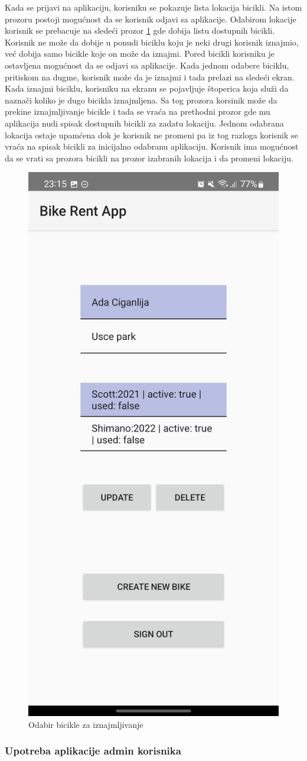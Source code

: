 \documentclass[12pt,oneside]{memoir}
\begin{document}
Kada se prijavi na aplikaciju, korisniku se pokazuje lista lokacija bicikli. Na istom prozoru postoji mogućnost da se korisnik odjavi sa aplikacije. Odabirom lokacije korisnik se prebacuje na sledeći prozor \ref{fig:odabirBicikle} gde dobija listu dostupnih bicikli. Korisnik ne može da dobije u ponudi biciklu koju je neki drugi korisnik iznajmio, već dobija samo bicikle koje on može da iznajmi. Pored bicikli korisniku je ostavljena mogućnost da se odjavi sa aplikacije. Kada jednom odabere biciklu, pritiskom na dugme, korisnik može da je iznajmi i tada prelazi na sledeći ekran. Kada iznajmi biciklu, korisniku na ekranu se pojavljuje štoperica koja služi da naznači koliko je dugo bicikla iznajmljena. Sa tog prozora korsinik može da prekine iznajmljivanje bicikle i tada se vraća na prethodni prozor gde mu aplikacija nudi spisak dostupnih bicikli za zadatu lokaciju. Jednom odabrana lokacija ostaje upamćena dok je korisnik ne promeni pa iz tog razloga korisnik se vraća na spisak bicikli za inicijalno odabranu aplikaciju. Korisnik ima mogućnost da se vrati sa prozora bicikli na prozor izabranih lokacija i da promeni lokaciju.
 

\begin{figure}[!ht]
  \centering
  \includegraphics[height=0.6\textwidth]{Odabir bicikle za iznajmljivanje.jpg}
  \caption{Odabir bicikle za iznajmljivanje}
  \label{fig:odabirBicikle}
\end{figure}
 
\subsubsection{Upotreba aplikacije admin korisnika}
\end{document}
